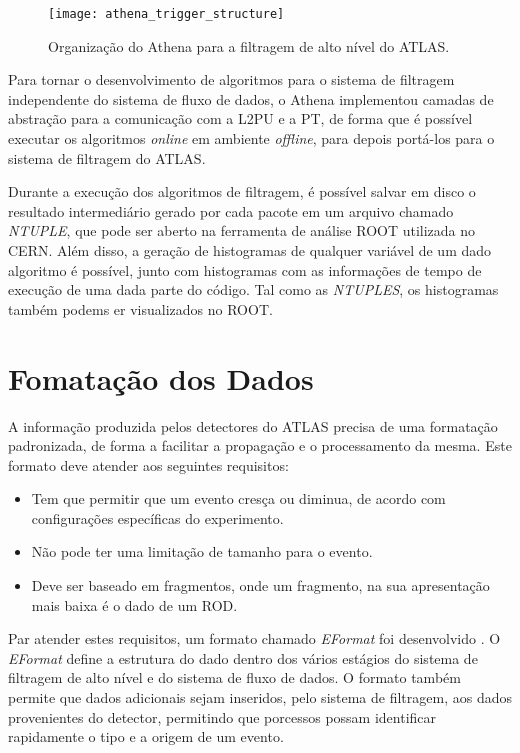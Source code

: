 \begin{figure}
\begin{center}
\texttt{[image: athena\_trigger\_structure]}
\caption{Organização do Athena para a filtragem de alto nível do ATLAS.}
\label{fig:athena_trigger_str}
\end{center}
\end{figure}

Para tornar o desenvolvimento de algoritmos para o sistema de filtragem independente do sistema de fluxo de dados, o Athena implementou camadas de abstração para a comunicação com a L2PU e a PT, de forma que é possível executar os algoritmos \emph{online} em ambiente \emph{offline}, para depois portá-los para o sistema de filtragem do ATLAS.

Durante a execução dos algoritmos de filtragem, é possível salvar em disco o resultado intermediário gerado por cada pacote em um arquivo chamado \emph{NTUPLE}, que pode ser aberto na ferramenta de análise ROOT \cite{bib:site_root} utilizada no CERN. Além disso, a geração de histogramas de qualquer variável de um dado algoritmo é possível, junto com histogramas com as informações de tempo de execução de uma dada parte do código. Tal como as \emph{NTUPLES}, os histogramas também podems er visualizados no ROOT.


\section{Fomatação dos Dados}
\label{sec:eformat}

A informação produzida pelos detectores do ATLAS precisa de uma formatação padronizada, de forma a facilitar a propagação e o processamento da mesma. Este formato deve atender aos seguintes requisitos:

\begin{itemize}

\item Tem que permitir que um evento cresça ou diminua, de acordo com configurações específicas do experimento.

\item Não pode ter uma limitação de tamanho para o evento.

\item Deve ser baseado em fragmentos, onde um fragmento, na sua apresentação mais baixa é o dado de um ROD.

\end{itemize}


Par atender estes requisitos, um formato chamado \emph{EFormat} foi desenvolvido \cite{bib:eformat}. O \emph{EFormat} define a estrutura do dado dentro dos vários estágios do sistema de filtragem de alto nível e do sistema de fluxo de dados. O formato também permite que dados adicionais sejam inseridos, pelo sistema de filtragem, aos dados provenientes do detector, permitindo que porcessos possam identificar rapidamente o tipo e a origem de um evento.

